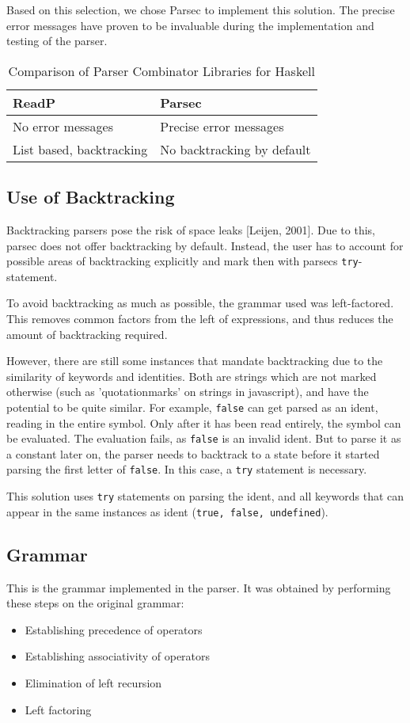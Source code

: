 \documentclass[11pt, a4paper]{article}
\begin{document}
Based on this selection, we chose Parsec to implement this solution. The precise error messages have proven to be invaluable during the implementation and testing of the parser.

\begin{table}[]
	\centering
	\caption{Comparison of Parser Combinator Libraries for Haskell}
	\label{table}
	\begin{tabular}{l|l}
		ReadP & Parsec\\ \hline
		No error messages& Precise error messages \\
		List based, backtracking & No backtracking by default \\
		
	\end{tabular}
\end{table}


\subsection{Use of Backtracking}
Backtracking parsers pose the risk of space leaks [Leijen, 2001]. Due to this, parsec does not offer backtracking by default. Instead, the user has to account for possible areas of backtracking explicitly and mark then with parsecs \texttt{try}-statement.

To avoid backtracking as much as possible, the grammar used was left-factored. This removes common factors from the left of expressions, and thus reduces the amount of backtracking required.

However, there are still some instances that mandate backtracking due to the similarity of keywords and identities. Both are strings which are not marked otherwise (such as  'quotationmarks' on strings in javascript), and have the potential to be quite similar. For example, \texttt{false} can get parsed as an ident, reading in the entire symbol. Only after it has been read entirely, the symbol can be evaluated. The evaluation fails, as \texttt{false} is an invalid ident. But to parse it as a constant later on, the parser needs to backtrack to a state before it started parsing the first letter of \texttt{false}. In this case, a \texttt{try} statement is necessary.

This solution uses \texttt{try} statements on parsing the ident, and all keywords that can appear in the same instances as ident (\texttt{true, false, undefined}).

\subsection{Grammar}
This is the grammar implemented in the parser. It was obtained by performing these steps on the original grammar:
\begin{itemize}
	\item Establishing precedence of operators
	\item Establishing associativity of operators
	\item Elimination of left recursion
	\item Left factoring
\end{itemize}
\end{document}

